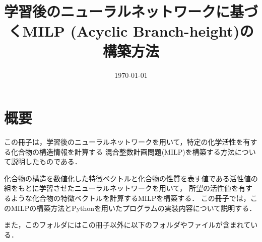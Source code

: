 \documentclass[11pt,titlepage,dvipdfmx,twoside]{jarticle}
\title{\Huge{学習後のニューラルネットワークに基づくMILP (Acyclic Branch-height)の構築方法}}
\begin{document}
\makeatletter 
\let\c@lstlisting\c@figure
\makeatother

\date{\today}

\maketitle


\thispagestyle{empty}
\tableofcontents
\clearpage


\section{概要}
\label{sec:Intro}
この冊子は，学習後のニューラルネットワークを用いて，特定の化学活性を有する化合物の構造情報を計算する
混合整数計画問題(MILP)を構築する方法について説明したものである．

化合物の構造を数値化した特徴ベクトルと化合物の性質を表す値である活性値の組をもとに学習させたニューラルネットワークを用いて，
所望の活性値を有するような化合物の特徴ベクトルを計算するMILPを構築する．
この冊子では，このMILPの構築方法とPythonを用いたプログラムの実装内容について説明する．

また，このフォルダにはこの冊子以外に以下のフォルダやファイルが含まれている．
\end{document}
